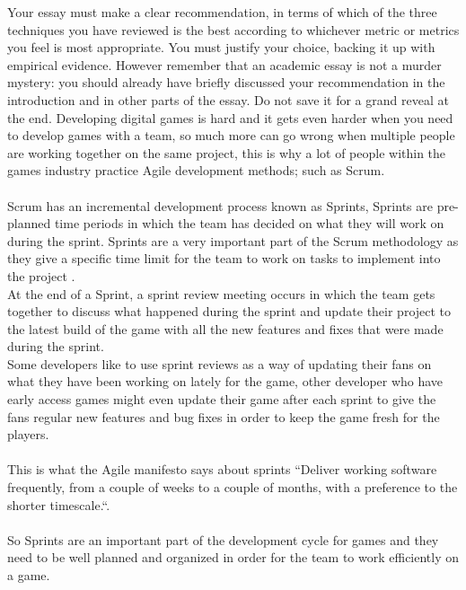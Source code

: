 \documentclass{scrartcl}
\begin{document}
Your essay must make a clear recommendation, in terms of which of the three techniques you have reviewed is the best according to whichever metric or metrics you feel is most appropriate. You must justify your choice, backing it up with empirical evidence. However remember that an academic essay is not a murder mystery: you should already have briefly discussed your recommendation in the introduction and in other parts of the essay. Do not save it for a grand reveal at the end.
\fi
Developing digital games is hard and it gets even harder when you need to develop games with a team, so much more can go wrong when multiple people are working together on the same project, this is why a lot of people within the games industry practice Agile development methods; such as Scrum.
\\~\\
Scrum has an incremental development process known as Sprints, Sprints are pre-planned time periods in which the team has decided on what they will work on during the sprint. Sprints are a very important part of the Scrum methodology as they give a specific time limit for the team to work on tasks to implement into the project \cite{five} \cite{eight}.\\
At the end of a Sprint, a sprint review meeting occurs in which the team gets together to discuss what happened during the sprint and update their project to the latest build of the game with all the new features and fixes that were made during the sprint\cite{eight}.\\
Some developers like to use sprint reviews as a way of updating their fans on what they have been working on lately for the game, other developer who have early access games might even update their game after each sprint to give the fans regular new features and bug fixes in order to keep the game fresh for the players.
\\~\\
This is what the Agile manifesto says about sprints ``Deliver working software frequently, from a couple of weeks to a couple of months, with a preference to the shorter timescale.``\cite{three}.
\\~\\
So Sprints are an important part of the development cycle for games and they need to be well planned and organized in order for the team to work efficiently on a game.
\end{document}
